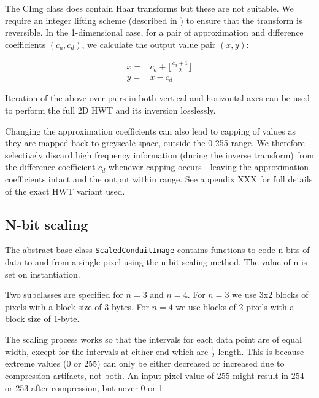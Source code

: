 The CImg class does contain Haar transforms but these are not suitable. We require an integer lifting scheme (described in \cite{haar}) to ensure that the transform is reversible. In the 1-dimensional case, for a pair of approximation and difference coefficients $(c_a,c_d)$, we calculate the output value pair $(x,y)$: 

\begin{eqnarray}
    x = & c_a + \lfloor \frac{c_d+1}{2} \rfloor \nonumber \\ 
    y = & x - c_d
\end{eqnarray}

Iteration of the above over pairs in both vertical and horizontal axes can be used to perform the full 2D HWT and its inversion losslessly.

Changing the approximation coefficients can also lead to capping of values as they are mapped back to greyscale space, outside the 0-255 range. We therefore selectively discard high frequency information (during the inverse transform) from the difference coefficient $c_d$ whenever capping occurs - leaving the approximation coefficients intact and the output within range. See appendix XXX for full details of the exact HWT variant used.



\FloatBarrier
\subsection{N-bit scaling}

The abstract base class {\tt ScaledConduitImage} contains functions to code n-bits of data to and from a single pixel using the n-bit scaling method. The value of n is set on instantiation.

Two subclasses are specified for $n=3$ and $n=4$. For $n=3$ we use 3x2 blocks of pixels with a block size of 3-bytes. For $n=4$ we use blocks of 2 pixels with a block size of 1-byte.

The scaling process works so that the intervals for each data point are of equal width, except for the intervals at either end which are $\frac{1}{2}$ length. This is because extreme values (0 or 255) can only be either decreased or increased due to compression artifacts, not both. An input pixel value of 255 might result in 254 or 253 after compression, but never 0 or 1.

